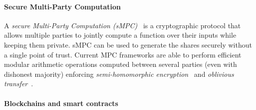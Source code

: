 
\paragraph{Secure Multi-Party Computation}

A {\em secure Multi-Party Computation (\em sMPC)}~\cite{DBLP:journals/corr/abs-1804-03548,yao82} is a cryptographic protocol that allows multiple parties to jointly compute a function over their inputs while keeping them private. sMPC can be used to generate the shares securely without a single point of trust.
Current MPC frameworks are able to perform efficient modular arithmetic operations computed between several parties (even with dishonest majority) enforcing {\em semi-homomorphic encryption}~\cite{spdz,keller2018overdrive} and {\em oblivious transfer}~\cite{mascot,rabin2005exchange}.

\paragraph{Blockchains and smart contracts}

